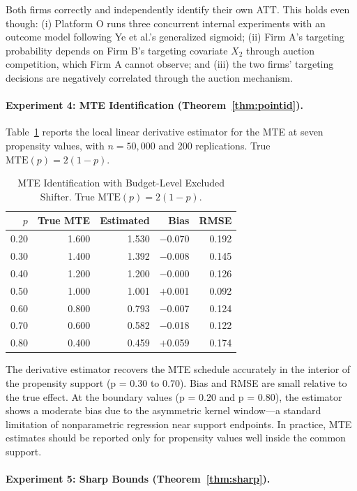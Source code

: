 \documentclass[12pt]{article}
\newcommand{\MTE}{\mathrm{MTE}}
\begin{document}
Both firms correctly and independently identify their own ATT. This holds
even though: (i) Platform O runs three concurrent internal experiments
with an outcome model following Ye et al.'s generalized sigmoid; (ii)
Firm A's targeting probability depends on Firm B's targeting covariate
$X_2$ through auction competition, which Firm A cannot observe; and (iii)
the two firms' targeting decisions are negatively correlated through the
auction mechanism.

\paragraph{Experiment 4: MTE Identification (Theorem~\ref{thm:pointid}).}

Table~\ref{tab:mte} reports the local linear derivative estimator for the
MTE at seven propensity values, with $n = 50{,}000$ and 200 replications.
True $\MTE(p) = 2(1-p)$.

\begin{table}[h!]
\centering
\caption{MTE Identification with Budget-Level Excluded Shifter.
True $\MTE(p) = 2(1-p)$.}
\label{tab:mte}
\begin{tabular}{r rrrr}
\toprule
$p$ & True MTE & Estimated & Bias & RMSE \\
\midrule
0.20 & 1.600 & 1.530 & $-$0.070 & 0.192 \\
0.30 & 1.400 & 1.392 & $-$0.008 & 0.145 \\
0.40 & 1.200 & 1.200 & $-$0.000 & 0.126 \\
0.50 & 1.000 & 1.001 & $+$0.001 & 0.092 \\
0.60 & 0.800 & 0.793 & $-$0.007 & 0.124 \\
0.70 & 0.600 & 0.582 & $-$0.018 & 0.122 \\
0.80 & 0.400 & 0.459 & $+$0.059 & 0.174 \\
\bottomrule
\end{tabular}
\end{table}

The derivative estimator recovers the MTE schedule accurately in the
interior of the propensity support (p = 0.30 to 0.70). Bias and RMSE are
small relative to the true effect. At the boundary values (p = 0.20 and
p = 0.80), the estimator shows a moderate bias due to the asymmetric kernel
window---a standard limitation of nonparametric regression near support
endpoints. In practice, MTE estimates should be reported only for propensity
values well inside the common support.

\paragraph{Experiment 5: Sharp Bounds (Theorem~\ref{thm:sharp}).}
\end{document}
